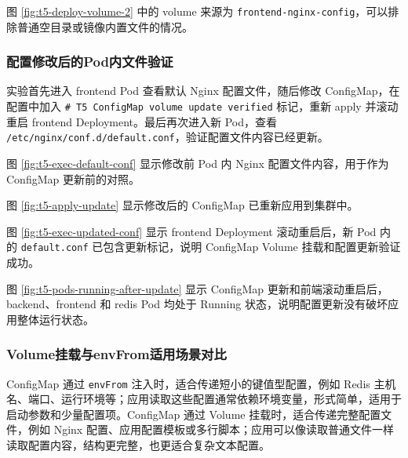 
图 \ref{fig:t5-deploy-volume-2} 中的 volume 来源为 \verb|frontend-nginx-config|，可以排除普通空目录或镜像内置文件的情况。

\subsubsection{配置修改后的Pod内文件验证}

实验首先进入 frontend Pod 查看默认 Nginx 配置文件，随后修改 ConfigMap，在配置中加入 \verb|# T5 ConfigMap volume update verified| 标记，重新 apply 并滚动重启 frontend Deployment。最后再次进入新 Pod，查看 \verb|/etc/nginx/conf.d/default.conf|，验证配置文件内容已经更新。


图 \ref{fig:t5-exec-default-conf} 显示修改前 Pod 内 Nginx 配置文件内容，用于作为 ConfigMap 更新前的对照。


图 \ref{fig:t5-apply-update} 显示修改后的 ConfigMap 已重新应用到集群中。


图 \ref{fig:t5-exec-updated-conf} 显示 frontend Deployment 滚动重启后，新 Pod 内的 \verb|default.conf| 已包含更新标记，说明 ConfigMap Volume 挂载和配置更新验证成功。


图 \ref{fig:t5-pods-running-after-update} 显示 ConfigMap 更新和前端滚动重启后，backend、frontend 和 redis Pod 均处于 Running 状态，说明配置更新没有破坏应用整体运行状态。

\subsubsection{Volume挂载与envFrom适用场景对比}

ConfigMap 通过 \verb|envFrom| 注入时，适合传递短小的键值型配置，例如 Redis 主机名、端口、运行环境等；应用读取这些配置通常依赖环境变量，形式简单，适用于启动参数和少量配置项。ConfigMap 通过 Volume 挂载时，适合传递完整配置文件，例如 Nginx 配置、应用配置模板或多行脚本；应用可以像读取普通文件一样读取配置内容，结构更完整，也更适合复杂文本配置。

